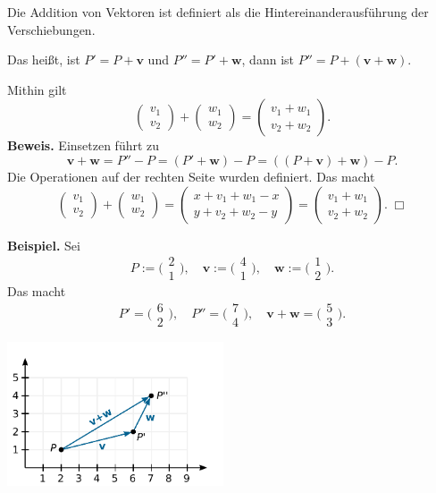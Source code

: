 \documentclass[9pt]{beamer}
\newcommand{\bv}[1]{\mathbf{#1}}
\newcommand{\strong}[1]{\textsf{\textbf{#1}}}
\renewcommand{\qedsymbol}{\ensuremath{\Box}}
\newcommand{\icol}[1]{
  \big(\!\begin{smallmatrix}#1\end{smallmatrix}\!\big)%
}
\newcommand{\parspace}{\vspace{0.8em}}
\begin{document}
\begin{frame}
Die Addition von Vektoren ist definiert als die Hintereinanderausführung
der Verschiebungen.

\parspace
Das heißt, ist $P' = P+\bv v$ und $P'' = P'+\bv w$,
dann ist $P'' = P+(\bv v+\bv w)$.\pause

\parspace
Mithin gilt
\[\begin{pmatrix}v_1\\ v_2\end{pmatrix} + \begin{pmatrix}w_1\\ w_2\end{pmatrix}
= \begin{pmatrix}v_1+w_1\\ v_2+w_2\end{pmatrix}.\]\pause
\strong{Beweis.} Einsetzen führt zu
\[\bv v+\bv w = P''-P = (P'+\bv w)-P = ((P+\bv v)+\bv w)-P.\]
Die Operationen auf der rechten Seite wurden definiert. Das macht
\[\begin{pmatrix}v_1\\ v_2\end{pmatrix} + \begin{pmatrix}w_1\\ w_2\end{pmatrix}
= \begin{pmatrix}x + v_1 + w_1 - x\\ y + v_2 + w_2 - y\end{pmatrix}
= \begin{pmatrix}v_1 + w_1\\ v_2 + w_2\end{pmatrix}.\;\qedsymbol\]
\end{frame}

\begin{frame}
\strong{Beispiel.} Sei
\[P:=\icol{2\\ 1},\quad
\bv v := \icol{4\\ 1},\quad \bv w := \icol{1\\ 2}.\]\pause
Das macht
\[P' = \icol{6\\ 2},\quad P'' = \icol{7\\ 4}, \quad\bv v+\bv w = \icol{5\\ 3}.\]

\vspace{-1em}
\begin{center}
\includegraphics[width=64mm]{img/vec-addition.pdf}
\end{center}
\end{frame}
\end{document}

